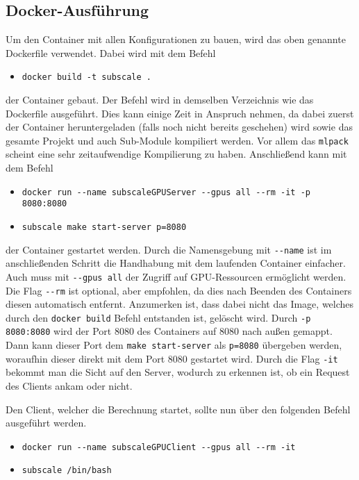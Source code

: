 \subsection{Docker-Ausführung}

Um den Container mit allen Konfigurationen zu bauen, wird das oben genannte Dockerfile verwendet. Dabei wird mit dem Befehl

\begin{itemize}
    \item[] \verb|docker build -t subscale .|
\end{itemize}

der Container gebaut. Der Befehl wird in demselben Verzeichnis wie das Dockerfile ausgeführt. Dies kann einige Zeit in Anspruch nehmen, da dabei zuerst der Container heruntergeladen (falls noch nicht bereits geschehen) wird sowie das gesamte Projekt und auch Sub-Module kompiliert werden. Vor allem das \verb|mlpack| scheint eine sehr zeitaufwendige Kompilierung zu haben. Anschließend kann mit dem Befehl

\begin{itemize}
    \item[] \verb|docker run --name subscaleGPUServer --gpus all --rm -it -p 8080:8080|
    \item[] \verb|subscale make start-server p=8080|
\end{itemize}

der Container gestartet werden. Durch die Namensgebung mit \verb|--name| ist im anschließenden Schritt die Handhabung mit dem laufenden Container einfacher. Auch muss mit \verb|--gpus all| der Zugriff auf GPU-Ressourcen ermöglicht werden. Die Flag \verb|--rm| ist optional, aber empfohlen, da dies nach Beenden des Containers diesen automatisch entfernt. Anzumerken ist, dass dabei nicht das Image, welches durch den \verb|docker build| Befehl entstanden ist, gelöscht wird. Durch \verb|-p 8080:8080| wird der Port 8080 des Containers auf 8080 nach außen gemappt. Dann kann dieser Port dem \verb|make start-server| als \verb|p=8080| übergeben werden, woraufhin dieser direkt mit dem Port 8080 gestartet wird. Durch die Flag \verb|-it| bekommt man die Sicht auf den Server, wodurch zu erkennen ist, ob ein Request des Clients ankam oder nicht.

Den Client, welcher die Berechnung startet, sollte nun über den folgenden Befehl ausgeführt werden.

\begin{itemize}
    \item[] \verb|docker run --name subscaleGPUClient --gpus all --rm -it|
    \item[] \verb|subscale /bin/bash|
\end{itemize}

